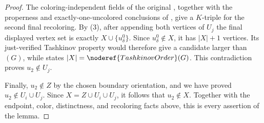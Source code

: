\begin{proof}
The coloring-independent fields of the original ,
together with the properness and exactly-one-uncolored conclusions of
, give a $K$-triple for
the second final recoloring.  By (3), after appending both vertices of
$U_j$ the final displayed vertex set is exactly
$X\cup\{u^0_\delta\}$.  Since $u^0_\delta\notin X$, it has $|X|+1$
vertices.  Its just-verified Tashkinov property would therefore give a
candidate larger than $(G)$, while
 states
$|X|=\noderef{TashkinovOrder}(G)$.  This contradiction proves
$u_2\notin U_j$.

Finally, $u_2\notin Z$ by the chosen boundary orientation, and we have
proved $u_2\notin U_i\cup U_j$.  Since
$X=Z\cup U_i\cup U_j$, it follows that $u_2\notin X$.  Together with
the endpoint, color, distinctness, and recoloring facts above, this is
every assertion of the lemma.
\end{proof}
